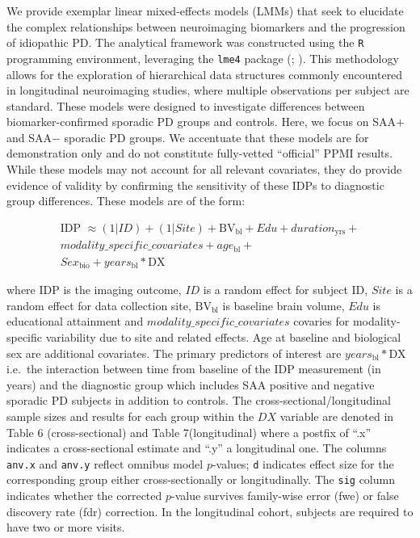 \documentclass[
  table]{article}
\begin{document}
We provide exemplar linear mixed-effects models (LMMs) that seek to
elucidate the complex relationships between neuroimaging biomarkers and
the progression of idiopathic PD. The analytical framework was
constructed using the \texttt{R} programming environment, leveraging the
\texttt{lme4} package
(; ). This methodology allows for the exploration of hierarchical data
structures commonly encountered in longitudinal neuroimaging studies,
where multiple observations per subject are standard. These models were
designed to investigate differences between biomarker-confirmed sporadic
PD groups and controls. Here, we focus on SAA\(+\) and SAA\(-\) sporadic
PD groups. We accentuate that these models are for demonstration only
and do not constitute fully-vetted ``official'' PPMI results. While
these models may not account for all relevant covariates, they do
provide evidence of validity by confirming the sensitivity of these IDPs
to diagnostic group differences. These models are of the form:

\[
\begin{split}
\text{IDP } \approx (1|ID) + (1|Site) + \text{BV}_\text{bl} + Edu + duration_\text{yrs} + \\
  modality\_specific\_covariates  + age_\text{bl} + \\ 
  Sex_\text{bio}  + years_\text{bl}   *  \text{DX}
\end{split}
\]

where IDP is the imaging outcome, \(ID\) is a random effect for subject
ID, \(Site\) is a random effect for data collection site,
\(\text{BV}_\text{bl}\) is baseline brain volume, \(Edu\) is educational
attainment and \(modality\_specific\_covariates\) covaries for
modality-specific variability due to site and related effects. Age at
baseline and biological sex are additional covariates. The primary
predictors of interest are \(years_\text{bl}   *  \text{DX}\) i.e.~the
interaction between time from baseline of the IDP measurement (in years)
and the diagnostic group which includes SAA positive and negative
sporadic PD subjects in addition to controls. The
cross-sectional/longitudinal sample sizes and results for each group
within the \(DX\) variable are denoted in Table 6 (cross-sectional) and
Table 7(longitudinal) where a postfix of ``.x'' indicates a
cross-sectional estimate and ``.y'' a longitudinal one. The columns
\texttt{anv.x} and \texttt{anv.y} reflect omnibus model \(p\)-values;
\texttt{d} indicates effect size for the corresponding group either
cross-sectionally or longitudinally. The \texttt{sig} column indicates
whether the corrected \(p\)-value survives family-wise error (fwe) or
false discovery rate (fdr) correction. In the longitudinal cohort,
subjects are required to have two or more visits.
\end{document}
